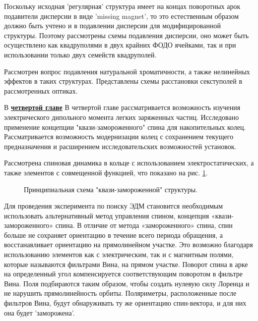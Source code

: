 \par Поскольку исходная 'регулярная' структура имеет на концах поворотных арок подавители дисперсии в виде 'missing magnet', то это естественным образом должно быть учтено и в подавлении дисперсии для модифицированной структуры. Поэтому рассмотрены схемы подавления дисперсии, оно может быть осуществлено как квадруполями в двух крайних ФОДО ячейками, так и при использовании только двух семейств квадруполей. 

\par Рассмотрен вопрос подавления натуральной хроматичности, а также нелинейных эффектов в таких структурах. Представлены схемы расстановки секступолей в рассмотренных оптиках.

В \underline{\textbf{четвертой главе}} В четвертой главе рассматривается возможность изучения электрического дипольного момента легких заряженных частиц. Исследовано применение концепции "квази-замороженного" спина для накопительных колец. Рассматривается возможность модернизации колец с сохранением текущего предназначения  и расширением исследовательских возможностей установок.
\par Рассмотрена спиновая динамика в кольце с использованием электростатических, а также элементов с совмещенной функцией, что по­казано на рис. \ref{fig:QFS}.

\begin{figure}[ht]
    \caption{Принципиальная схема "квази-замороженной" структуры.}\label{fig:QFS}
\end{figure}

\par Для проведения эксперимента по поиску ЭДМ становится необходимым использовать альтернативный метод управления спином, концепция «квази-замороженного» спина. В отличие от метода «замороженного» спина, спин больше не сохраняет ориентацию в течение всего периода обращения, а восстанавливает ориентацию на прямолинейном участке. Это возможно благодаря использованию элементов как с электрическим, так и с магнитным полями, которые называются фильтрами Вина, на прямом участке. Поворот спина в арке на определенный угол компенсируется соответствующим поворотом в фильтре Вина. Поля подбираются таким образом, чтобы создать нулевую силу Лоренца и не нарушить прямолинейность орбиты. Поляриметры, расположенные после фильтров Вина, будут обнаруживать ту же ориентацию спин-вектора, и для них она будет 'заморожена'.

